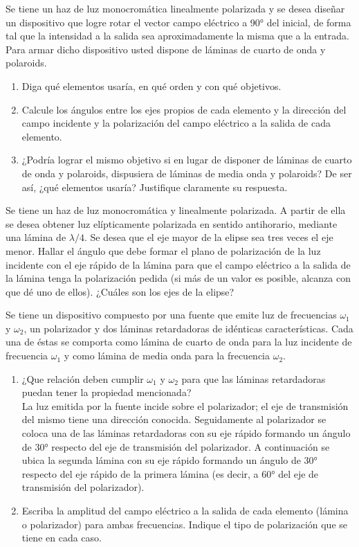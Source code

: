 \item Se tiene un haz de luz monocromática linealmente polarizada y se desea diseñar un dispositivo que logre rotar el vector campo eléctrico a \ang{90;;} del inicial, de forma tal que la intensidad a la salida sea aproximadamente la misma que a la entrada.
Para armar dicho dispositivo usted dispone de láminas de cuarto de onda y polaroids.
\begin{enumerate}
	\item Diga qué elementos usaría, en qué orden y con qué objetivos.
	\item Calcule los ángulos entre los ejes propios de cada elemento y la dirección del campo incidente y la polarización del campo eléctrico a la salida de cada elemento.
	\item ¿Podría lograr el mismo objetivo si en lugar de disponer de láminas de cuarto de onda y polaroids, dispusiera de láminas de media onda y polaroids?
	De ser así, ¿qué elementos usaría?
	Justifique claramente su respuesta.
\end{enumerate}



\item Se tiene un haz de luz monocromática y linealmente polarizada.
A partir de ella se desea obtener luz elípticamente polarizada en sentido antihorario, mediante una lámina de \(\lambda/4\).
Se desea que el eje mayor de la elipse sea tres veces el eje menor.
Hallar el ángulo que debe formar el plano de polarización de la luz incidente con el eje rápido de la lámina para que el campo eléctrico a la salida de la lámina
tenga la polarización pedida (si más de un valor es posible, alcanza con que dé uno de ellos).
¿Cuáles son los ejes de la elipse?



\item Se tiene un dispositivo compuesto por una fuente que emite luz de frecuencias $\omega_1$ y $\omega_2$, un polarizador y dos láminas retardadoras de idénticas características.
Cada una de éstas se comporta como lámina de cuarto de onda para la luz incidente de frecuencia $\omega_1$ y como lámina de media onda para la frecuencia $\omega_2$.
\begin{enumerate}
	\item ¿Que relación deben cumplir $\omega_1$ y $\omega_2$ para que las láminas retardadoras puedan tener la propiedad mencionada? \medskip{} \\
	La luz emitida por la fuente incide sobre el polarizador; el eje de transmisión del mismo tiene una dirección conocida.
	Seguidamente al polarizador se coloca una de las láminas retardadoras con su eje rápido formando un ángulo de \ang{+30;;} respecto del eje de transmisión del polarizador.
	A continuación se ubica la segunda lámina con su eje rápido formando un ángulo de \ang{+30;;} respecto del eje rápido de la primera lámina (es decir, a \ang{+60;;} del eje de transmisión del polarizador).
	\item Escriba la amplitud del campo eléctrico a la salida de cada elemento (lámina o polarizador) para ambas frecuencias.
	Indique el tipo de polarización que se tiene en cada caso. 
\end{enumerate}



